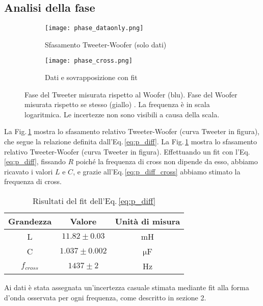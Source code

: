 \documentclass[../Relazione_circuiti]{subfiles}
\begin{document}
\subsection{Analisi della fase}

  \begin{figure}[H]
    \centering

    \begin{subfigure}{=0.49\textwidth}
      \centering
      \texttt{[image: phase\_dataonly.png]}
      \caption{Sfasamento Tweeter-Woofer (solo dati)}
      \label{fig: pdiff_dataonly}

    \end{subfigure}
    \hfill
    \begin{subfigure}{=0.49\textwidth}
      \centering
      \texttt{[image: phase\_cross.png]}
      \caption{Dati e sovrapposizione con fit}
      \label{fig: pdiff_fit_data}

    \end{subfigure}

    \caption{Fase del Tweeter misurata rispetto al Woofer (blu). Fase del Woofer misurata rispetto se stesso (giallo)
      . La frequenza è in scala logaritmica. Le incertezze non sono visibili a causa della scala.}
    \label{fig: phase_diff}

  \end{figure}

  La Fig.\,\ref{fig: pdiff_dataonly} mostra lo sfasamento relativo Tweeter-Woofer (curva Tweeter in figura), che segue la
  relazione definita dall'Eq.\,\eqref{eq:p_diff}.
  La Fig.\,\ref{fig: pdiff_dataonly} mostra lo sfasamento relativo Tweeter-Woofer (curva Tweeter in figura).
  Effettuando un fit con l'Eq.\,\eqref{eq:p_diff}, fissando $R$
      poiché la frequenza di cross non dipende da esso, abbiamo
      ricavato i valori $L$ e $C$, e grazie all'Eq.\,\eqref{eq:p_diff_cross} abbiamo stimato la frequenza di cross.


  \begin{table}[H]
    \centering

    \begin{tabular}{c | c | c}
      Grandezza   & Valore              & Unità di misura \\
      \hline
      L           & $ 11.82 \pm 0.03 $  & mH              \\
      C           & $ 1.037 \pm 0.002 $ & $\mathrm{\mu}$F \\
      $f_{cross}$ & $ 1437 \pm 2$       & Hz

    \end{tabular}
    \caption{Risultati del fit dell'Eq.\,\eqref{eq:p_diff}}
    \label{tab:fit_phase}

  \end{table}
  Ai dati è stata assegnata un'incertezza casuale stimata mediante fit alla forma d'onda osservata per ogni frequenza,
  come descritto in sezione 2.
\end{document}
